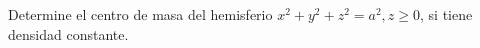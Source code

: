 \item Determine el centro de masa del hemisferio $x^2 + y^2 + z^2 = a^2, z \ge 0$, si tiene densidad constante.
